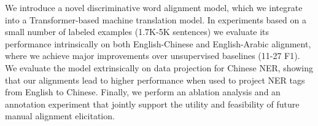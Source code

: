 We introduce a novel discriminative word alignment model, which we integrate into a Transformer-based machine translation model. In experiments based on a small number of labeled examples (\∼1.7K-5K sentences) we evaluate its performance intrinsically on both English-Chinese and English-Arabic alignment, where we achieve major improvements over unsupervised baselines (11-27 F1). We evaluate the model extrinsically on data projection for Chinese NER, showing that our alignments lead to higher performance when used to project NER tags from English to Chinese. Finally, we perform an ablation analysis and an annotation experiment that jointly support the utility and feasibility of future manual alignment elicitation.
